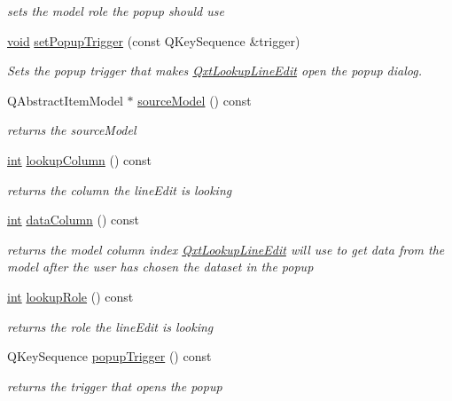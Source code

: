 \begin{DoxyCompactItemize}
\begin{DoxyCompactList}\small\item\em sets the model role the popup should use \end{DoxyCompactList}\item 
\hyperlink{group___u_a_v_objects_plugin_ga444cf2ff3f0ecbe028adce838d373f5c}{void} \hyperlink{class_qxt_lookup_line_edit_a0a7a95e44e0b81b5983a7743a27cf57b}{set\-Popup\-Trigger} (const Q\-Key\-Sequence \&trigger)
\begin{DoxyCompactList}\small\item\em Sets the popup trigger that makes \hyperlink{class_qxt_lookup_line_edit}{Qxt\-Lookup\-Line\-Edit} open the popup dialog. \end{DoxyCompactList}\item 
Q\-Abstract\-Item\-Model $\ast$ \hyperlink{class_qxt_lookup_line_edit_a971a5c3fd81a3e8ea66ebc9c723acfda}{source\-Model} () const 
\begin{DoxyCompactList}\small\item\em returns the source\-Model \end{DoxyCompactList}\item 
\hyperlink{ioapi_8h_a787fa3cf048117ba7123753c1e74fcd6}{int} \hyperlink{class_qxt_lookup_line_edit_a2f0b1d4ec11f8f3b9898cc294ba26b80}{lookup\-Column} () const 
\begin{DoxyCompactList}\small\item\em returns the column the line\-Edit is looking \end{DoxyCompactList}\item 
\hyperlink{ioapi_8h_a787fa3cf048117ba7123753c1e74fcd6}{int} \hyperlink{class_qxt_lookup_line_edit_ae52b73a903d43d027b49b75283da1a55}{data\-Column} () const 
\begin{DoxyCompactList}\small\item\em returns the model column index \hyperlink{class_qxt_lookup_line_edit}{Qxt\-Lookup\-Line\-Edit} will use to get data from the model after the user has chosen the dataset in the popup \end{DoxyCompactList}\item 
\hyperlink{ioapi_8h_a787fa3cf048117ba7123753c1e74fcd6}{int} \hyperlink{class_qxt_lookup_line_edit_a2b4241e0dc9cd5b505901645da33b19b}{lookup\-Role} () const 
\begin{DoxyCompactList}\small\item\em returns the role the line\-Edit is looking \end{DoxyCompactList}\item 
Q\-Key\-Sequence \hyperlink{class_qxt_lookup_line_edit_a654d1f9353c214ce486d81f74af0e94c}{popup\-Trigger} () const 
\begin{DoxyCompactList}\small\item\em returns the trigger that opens the popup \end{DoxyCompactList}\end{DoxyCompactItemize}
